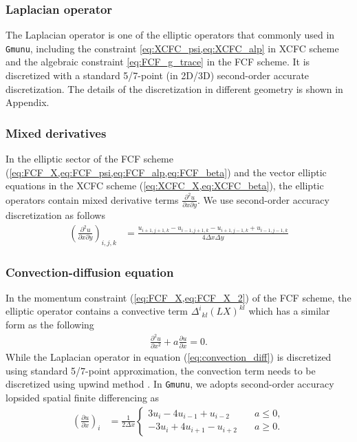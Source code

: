 \subsubsection{Laplacian operator}
The Laplacian operator is one of the elliptic operators that commonly used in \texttt{Gmunu},
including the constraint \cref{eq:XCFC_psi,eq:XCFC_alp} in XCFC scheme 
and the algebraic constraint \cref{eq:FCF_g_trace} in the FCF scheme.
It is discretized with a standard 5/7-point (in 2D/3D) second-order accurate discretization.
The details of the discretization in different geometry is shown in Appendix.

\subsubsection{Mixed derivatives}
In the elliptic sector of the FCF scheme (\cref{eq:FCF_X,eq:FCF_psi,eq:FCF_alp,eq:FCF_beta})
and the vector elliptic equations in the XCFC scheme (\cref{eq:XCFC_X,eq:XCFC_beta}),
the elliptic operators contain mixed derivative terms $\frac{\partial^2 u}{\partial x \partial y}$.
We use second-order accuracy discretization as follows
\begin{align}
    \left(\frac{\partial^2 u}{\partial x \partial y} \right)_{i,j,k} &=
    \frac{u_{i+1,j+1,k} - u_{i-1,j+1,k} - u_{i+1,j-1,k} + u_{i-1,j-1,k}}{4 \Delta x \Delta y}
\end{align}

\subsubsection{Convection-diffusion equation}
In the momentum constraint (\cref{eq:FCF_X,eq:FCF_X_2}) of the FCF scheme,
the elliptic operator contains a convective term $\Delta^i{}_{kl}\left( L X \right)^{kl}$
which has a similar form as the following
\begin{align}\label{eq:convection_diff}
    \frac{\partial^2 u}{\partial x^2} + a \frac{\partial u}{\partial x} = 0.
\end{align}
While the Laplacian operator in equation (\ref{eq:convection_diff}) is discretized using standard 5/7-point approximation,
the convection term needs to be discretized using upwind method \cite{trottenberg2000multigrid}.
In \texttt{Gmunu}, we adopts second-order accuracy lopsided spatial finite differencing as
\begin{align}
    \left(\frac{\partial u}{\partial x} \right)_i &= \frac{1}{2 \Delta x}
    \begin{cases}
        3 u_i - 4 u_{i-1} + u_{i-2} &\quad a \leq 0,\\
        -3 u_i + 4 u_{i+1} - u_{i+2} &\quad a \geq 0.
    \end{cases}
\end{align}

